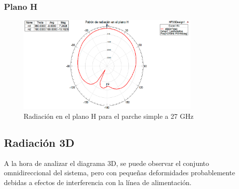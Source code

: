 \subsubsection{Plano H}
\begin{figure}[H]
    \centering
        \includegraphics[width=0.8\textwidth]{archivos/analisis/1x13/5}
        \caption{Radiación en el plano H para el parche simple a 27 GHz}
        \label{fig:H1x13}
\end{figure}

\newpage
\subsection{Radiación 3D}
\par A la hora de analizar el diagrama 3D, se puede observar el conjunto omnidireccional del sistema, pero con pequeñas deformidades probablemente debidas a efectos de interferencia con la línea de alimentación. 

